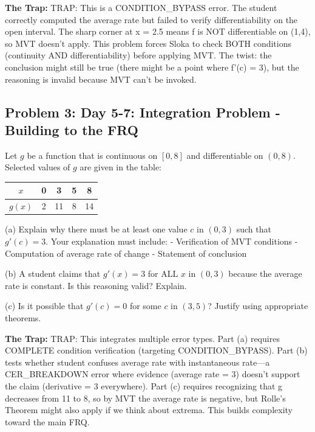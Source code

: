 \documentclass[11pt,letterpaper]{article}
\begin{document}
\textbf{The Trap:} TRAP: This is a CONDITION_BYPASS error. The student correctly computed the average rate but failed to verify differentiability on the open interval. The sharp corner at x = 2.5 means f is NOT differentiable on (1,4), so MVT doesn't apply. This problem forces Sloka to check BOTH conditions (continuity AND differentiability) before applying MVT. The twist: the conclusion might still be true (there might be a point where f'(c) = 3), but the reasoning is invalid because MVT can't be invoked.

\vspace{0.5cm}


\subsection*{Problem 3: Day 5-7: Integration Problem - Building to the FRQ}

\begin{tcolorbox}[colback=blue!5!white, colframe=blue!50, arc=2mm]
  Let $g$ be a function that is continuous on $[0, 8]$ and differentiable on $(0, 8)$. Selected values of $g$ are given in the table:

\begin{center}
\begin{tabular}{|c|c|c|c|c|}
\hline
$x$ & 0 & 3 & 5 & 8 \\
\hline
$g(x)$ & 2 & 11 & 8 & 14 \\
\hline
\end{tabular}
\end{center}

(a) Explain why there must be at least one value $c$ in $(0, 3)$ such that $g'(c) = 3$. Your explanation must include:
   - Verification of MVT conditions
   - Computation of average rate of change
   - Statement of conclusion

(b) A student claims that $g'(x) = 3$ for ALL $x$ in $(0, 3)$ because the average rate is constant. Is this reasoning valid? Explain.

(c) Is it possible that $g'(c) = 0$ for some $c$ in $(3, 5)$? Justify using appropriate theorems.
\end{tcolorbox}

\textbf{The Trap:} TRAP: This integrates multiple error types. Part (a) requires COMPLETE condition verification (targeting CONDITION_BYPASS). Part (b) tests whether student confuses average rate with instantaneous rate—a CER_BREAKDOWN error where evidence (average rate = 3) doesn't support the claim (derivative = 3 everywhere). Part (c) requires recognizing that g decreases from 11 to 8, so by MVT the average rate is negative, but Rolle's Theorem might also apply if we think about extrema. This builds complexity toward the main FRQ.
\end{document}
